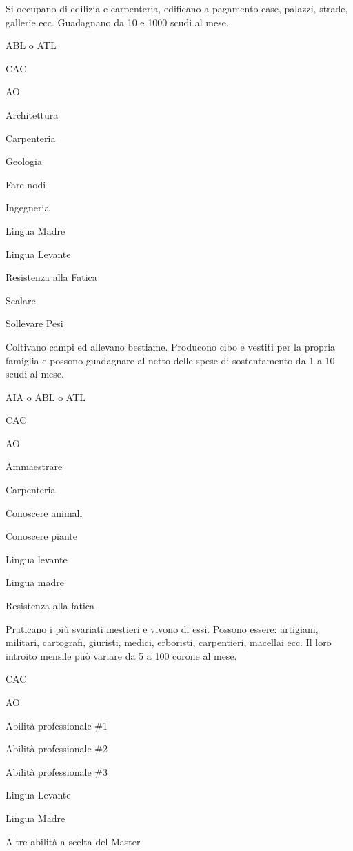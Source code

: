 
Si occupano di edilizia e carpenteria, edificano a pagamento case,
palazzi, strade, gallerie ecc. Guadagnano da 10 e 1000 scudi al
mese.

\begin{abilist}
\item ABL o ATL
\item CAC
\item AO
\item Architettura
\item Carpenteria
\item Geologia
\item Fare nodi
\item Ingegneria
\item Lingua Madre
\item Lingua Levante
\item Resistenza alla Fatica
\item Scalare
\item Sollevare Pesi
\end{abilist}


Coltivano campi ed allevano bestiame. Producono cibo e vestiti per la
propria famiglia e possono guadagnare al netto delle spese di
sostentamento da 1 a 10 scudi al mese.

\begin{abilist}
\item AIA o ABL o ATL
\item CAC
\item AO
\item Ammaestrare
\item Carpenteria
\item Conoscere animali
\item Conoscere piante
\item Lingua levante
\item Lingua madre
\item Resistenza alla fatica
\end{abilist}


Praticano i pi\`u svariati mestieri e vivono di essi. Possono essere: artigiani,
militari, cartografi, giuristi, medici, erboristi, carpentieri, macellai ecc.
Il loro introito mensile pu\`o variare da 5 a 100 corone al mese.

\begin{abilist}
\item CAC
\item AO
\item Abilit\`a professionale \#1
\item Abilit\`a professionale \#2
\item Abilit\`a professionale \#3
\item Lingua Levante
\item Lingua Madre
\item Altre abilit\`a a scelta del Master
\end{abilist}


